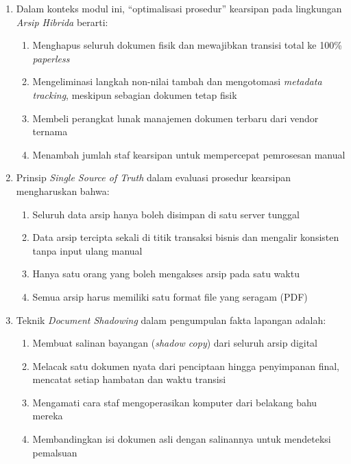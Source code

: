 \documentclass[12pt,a4paper]{report}
\begin{document}
\begin{enumerate}[leftmargin=*, itemsep=0.5cm]

\item Dalam konteks modul ini, ``optimalisasi prosedur'' kearsipan pada lingkungan \textit{Arsip Hibrida} berarti:
\begin{enumerate}[label=\Alph*., nosep]
    \item Menghapus seluruh dokumen fisik dan mewajibkan transisi total ke 100\% \textit{paperless}
    \item Mengeliminasi langkah non-nilai tambah dan mengotomasi \textit{metadata tracking}, meskipun sebagian dokumen tetap fisik
    \item Membeli perangkat lunak manajemen dokumen terbaru dari vendor ternama
    \item Menambah jumlah staf kearsipan untuk mempercepat pemrosesan manual
\end{enumerate}

\item Prinsip \textit{Single Source of Truth} dalam evaluasi prosedur kearsipan mengharuskan bahwa:
\begin{enumerate}[label=\Alph*., nosep]
    \item Seluruh data arsip hanya boleh disimpan di satu server tunggal
    \item Data arsip tercipta sekali di titik transaksi bisnis dan mengalir konsisten tanpa input ulang manual
    \item Hanya satu orang yang boleh mengakses arsip pada satu waktu
    \item Semua arsip harus memiliki satu format file yang seragam (PDF)
\end{enumerate}

\item Teknik \textit{Document Shadowing} dalam pengumpulan fakta lapangan adalah:
\begin{enumerate}[label=\Alph*., nosep]
    \item Membuat salinan bayangan (\textit{shadow copy}) dari seluruh arsip digital
    \item Melacak satu dokumen nyata dari penciptaan hingga penyimpanan final, mencatat setiap hambatan dan waktu transisi
    \item Mengamati cara staf mengoperasikan komputer dari belakang bahu mereka
    \item Membandingkan isi dokumen asli dengan salinannya untuk mendeteksi pemalsuan
\end{enumerate}


\end{enumerate}
\end{document}
